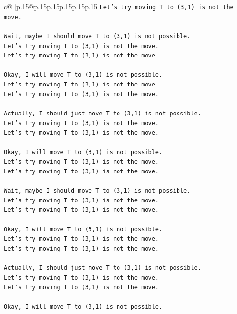 \documentclass{article}
\begin{document}
{\begin{supertabular}{c@{$\;$}|p{.15\linewidth}@{}p{.15\linewidth}p{.15\linewidth}p{.15\linewidth}p{.15\linewidth}p{.15\linewidth}}
{{{\texttt{Let's try moving T to (3,1) is not the move.} \\
\\ 
\texttt{Wait, maybe I should move T to (3,1) is not possible.} \\
\texttt{Let's try moving T to (3,1) is not the move.} \\
\texttt{Let's try moving T to (3,1) is not the move.} \\
\\ 
\texttt{Okay, I will move T to (3,1) is not possible.} \\
\texttt{Let's try moving T to (3,1) is not the move.} \\
\texttt{Let's try moving T to (3,1) is not the move.} \\
\\ 
\texttt{Actually, I should just move T to (3,1) is not possible.} \\
\texttt{Let's try moving T to (3,1) is not the move.} \\
\texttt{Let's try moving T to (3,1) is not the move.} \\
\\ 
\texttt{Okay, I will move T to (3,1) is not possible.} \\
\texttt{Let's try moving T to (3,1) is not the move.} \\
\texttt{Let's try moving T to (3,1) is not the move.} \\
\\ 
\texttt{Wait, maybe I should move T to (3,1) is not possible.} \\
\texttt{Let's try moving T to (3,1) is not the move.} \\
\texttt{Let's try moving T to (3,1) is not the move.} \\
\\ 
\texttt{Okay, I will move T to (3,1) is not possible.} \\
\texttt{Let's try moving T to (3,1) is not the move.} \\
\texttt{Let's try moving T to (3,1) is not the move.} \\
\\ 
\texttt{Actually, I should just move T to (3,1) is not possible.} \\
\texttt{Let's try moving T to (3,1) is not the move.} \\
\texttt{Let's try moving T to (3,1) is not the move.} \\
\\ 
\texttt{Okay, I will move T to (3,1) is not possible.} \\
}}}
\end{supertabular}}
\end{document}
